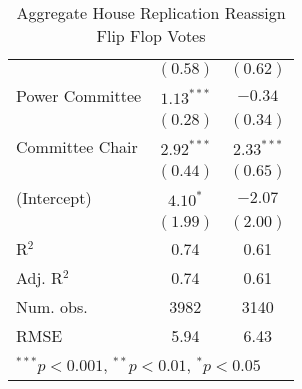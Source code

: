 \documentclass[12pt]{article}
\begin{document}
\begin{table}
\begin{center}
\begin{tabular}{l c c }
			& $(0.58)$      & $(0.62)$      \\
			Power Committee                     & $1.13^{***}$  & $-0.34$       \\
			& $(0.28)$      & $(0.34)$      \\
			Committee Chair                     & $2.92^{***}$  & $2.33^{***}$  \\
			& $(0.44)$      & $(0.65)$      \\
			(Intercept)                 & $4.10^{*}$    & $-2.07$       \\
			& $(1.99)$      & $(2.00)$      \\
			\hline
			R$^2$                       & 0.74          & 0.61          \\
			Adj. R$^2$                  & 0.74          & 0.61          \\
			Num. obs.                   & 3982          & 3140          \\
			RMSE                        & 5.94          & 6.43          \\
			\hline
			\multicolumn{3}{l}{\scriptsize{$^{***}p<0.001$, $^{**}p<0.01$, $^*p<0.05$}}
		\end{tabular}
		\caption{Aggregate House Replication Reassign Flip Flop Votes}
		\label{table:coefficients}
	\end{center}
\end{table}
	
	
	
	
\end{document}
